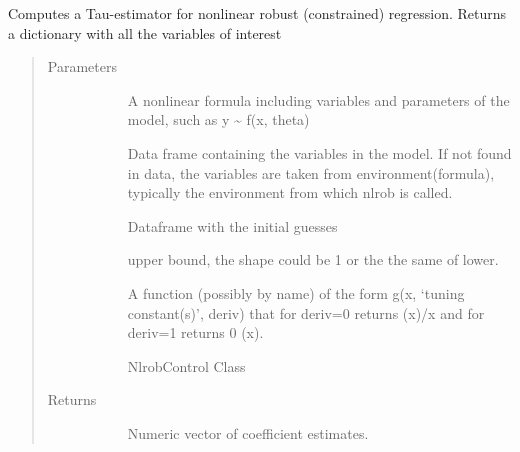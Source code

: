 \documentclass[letterpaper,10pt,english]{sphinxmanual}
\begin{document}
\begin{fulllineitems}
\label{\detokenize{_modules/nlrob:nlrob.nlrob_tau}}
Computes a Tau-estimator for nonlinear robust (constrained) regression.
Returns a dictionary with all the variables of interest
\begin{quote}\begin{description}
\item[{Parameters}] \leavevmode\begin{description}
\item[{}] \leavevmode
A nonlinear formula including variables and parameters of the model,
such as y \textasciitilde{} f(x, theta)

\item[{}] \leavevmode
Data frame containing the variables in the model. If not found in
data, the variables are taken from environment(formula), typically
the environment from which nlrob is called.

\item[{}] \leavevmode
Dataframe with the initial guesses

\item[{}] \leavevmode
upper bound, the shape could be 1 or the the same of lower.

\item[{}] \leavevmode
A function (possibly by name) of the form g(x, ‘tuning constant(s)’,
deriv)
that for deriv=0 returns (x)/x and for deriv=1 returns  0 (x).

\item[{}] \leavevmode
\item[{}] \leavevmode
NlrobControl Class

\end{description}

\item[{Returns}] \leavevmode\begin{description}
\item[{}] \leavevmode
Numeric vector of coefficient estimates.


\end{description}
\end{description}
\end{quote}
\end{fulllineitems}
\end{document}
